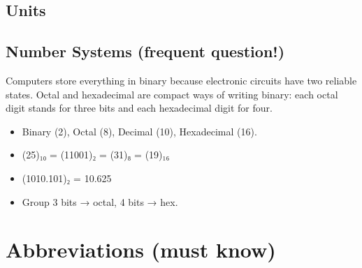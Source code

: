 \hypertarget{p1-08--units}{%
\subsection{Units}\label{p1-08--units}}



\needspace{125pt}

\hypertarget{p1-08--number-systems-frequent-question}{%
\subsection{Number Systems (frequent question!)}\label{p1-08--number-systems-frequent-question}}

Computers store everything in binary because electronic circuits have two reliable states. Octal and
hexadecimal are compact ways of writing binary: each octal digit stands for three bits and each hexadecimal
digit for four.

\begin{itemize}
\tightlist
\item
  Binary (2), Octal (8), Decimal (10), Hexadecimal (16).
\item
  (25)₁₀ = (11001)₂ = (31)₈ = (19)₁₆
\item
  (1010.101)₂ = 10.625
\item
  Group 3 bits → octal, 4 bits → hex.
\end{itemize}

\needspace{130pt}

\hypertarget{p1-08--2-abbreviations-must-know}{%
\section{Abbreviations (must know)}\label{p1-08--2-abbreviations-must-know}}

\begingroup\small

